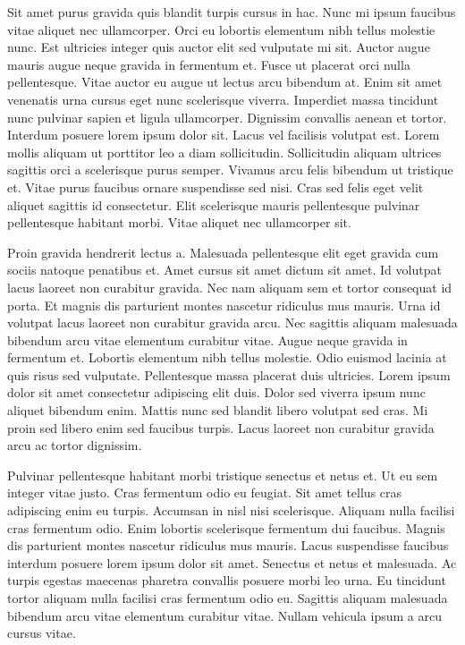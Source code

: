 \documentclass[11pt,a4paper]{article}
\begin{document}
Sit amet purus gravida quis blandit turpis cursus in hac. Nunc mi ipsum faucibus vitae aliquet nec ullamcorper. Orci eu lobortis elementum nibh tellus molestie nunc. Est ultricies integer quis auctor elit sed vulputate mi sit. Auctor augue mauris augue neque gravida in fermentum et. Fusce ut placerat orci nulla pellentesque. Vitae auctor eu augue ut lectus arcu bibendum at. Enim sit amet venenatis urna cursus eget nunc scelerisque viverra. Imperdiet massa tincidunt nunc pulvinar sapien et ligula ullamcorper. Dignissim convallis aenean et tortor. Interdum posuere lorem ipsum dolor sit. Lacus vel facilisis volutpat est. Lorem mollis aliquam ut porttitor leo a diam sollicitudin. Sollicitudin aliquam ultrices sagittis orci a scelerisque purus semper. Vivamus arcu felis bibendum ut tristique et. Vitae purus faucibus ornare suspendisse sed nisi. Cras sed felis eget velit aliquet sagittis id consectetur. Elit scelerisque mauris pellentesque pulvinar pellentesque habitant morbi. Vitae aliquet nec ullamcorper sit.

Proin gravida hendrerit lectus a. Malesuada pellentesque elit eget gravida cum sociis natoque penatibus et. Amet cursus sit amet dictum sit amet. Id volutpat lacus laoreet non curabitur gravida. Nec nam aliquam sem et tortor consequat id porta. Et magnis dis parturient montes nascetur ridiculus mus mauris. Urna id volutpat lacus laoreet non curabitur gravida arcu. Nec sagittis aliquam malesuada bibendum arcu vitae elementum curabitur vitae. Augue neque gravida in fermentum et. Lobortis elementum nibh tellus molestie. Odio euismod lacinia at quis risus sed vulputate. Pellentesque massa placerat duis ultricies. Lorem ipsum dolor sit amet consectetur adipiscing elit duis. Dolor sed viverra ipsum nunc aliquet bibendum enim. Mattis nunc sed blandit libero volutpat sed cras. Mi proin sed libero enim sed faucibus turpis. Lacus laoreet non curabitur gravida arcu ac tortor dignissim.

Pulvinar pellentesque habitant morbi tristique senectus et netus et. Ut eu sem integer vitae justo. Cras fermentum odio eu feugiat. Sit amet tellus cras adipiscing enim eu turpis. Accumsan in nisl nisi scelerisque. Aliquam nulla facilisi cras fermentum odio. Enim lobortis scelerisque fermentum dui faucibus. Magnis dis parturient montes nascetur ridiculus mus mauris. Lacus suspendisse faucibus interdum posuere lorem ipsum dolor sit amet. Senectus et netus et malesuada. Ac turpis egestas maecenas pharetra convallis posuere morbi leo urna. Eu tincidunt tortor aliquam nulla facilisi cras fermentum odio eu. Sagittis aliquam malesuada bibendum arcu vitae elementum curabitur vitae. Nullam vehicula ipsum a arcu cursus vitae.
\end{document}
